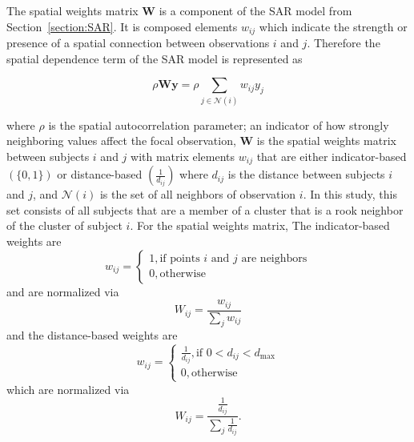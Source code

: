 \documentclass{article}[11pt]
\begin{document}


The spatial weights matrix $\mathbf{W}$ is a component of the SAR model from Section~\ref{section:SAR}. It is composed elements $w_{ij}$ which indicate the strength or presence of a spatial connection between observations $i$ and $j$. Therefore the spatial dependence term of the SAR model is represented as

\begin{equation}
    \rho\mathbf{Wy} = \rho\sum_{j \in \mathcal{N}(i)}w_{ij}y_j
\end{equation}

where $\rho$ is the spatial autocorrelation parameter; an indicator of how strongly neighboring values affect the focal observation, $\mathbf{W}$ is the spatial weights matrix between subjects $i$ and $j$ with matrix elements $w_{ij}$ that are either indicator-based $(\{0,1\})$ or distance-based $\left(\frac{1}{d_{ij}}\right)$ where $d_{ij}$ is the distance between subjects $i$ and $j$, and $\mathcal{N}(i)$ is the set of all neighbors of observation $i$. In this study, this set consists of all subjects that are a member of a cluster that is a rook neighbor of the cluster of subject $i$. For the spatial weights matrix, The indicator-based weights are
\begin{equation}
    w_{ij} = 
    \begin{cases}
    1, \text{if points $i$ and $j$ are neighbors}\\
    0, \text{otherwise} 
    \end{cases}
\end{equation}
and are normalized via
\begin{equation}
    W_{ij} = \frac{w_{ij}}{\sum_{j}w_{ij}}
\end{equation}
and the distance-based weights are
\begin{equation}
    w_{ij} = 
    \begin{cases}
    \frac{1}{d_{ij}}, \text{if $0 < d_{ij} < d_{\text{max}}$}\\
    0, \text{otherwise} 
    \end{cases}
\end{equation}
which are normalized via
\begin{equation}
    W_{ij} = \frac{\frac{1}{d_{ij}}}{\sum_{j}\frac{1}{d_{ij}}}.
\end{equation}
\end{document}
